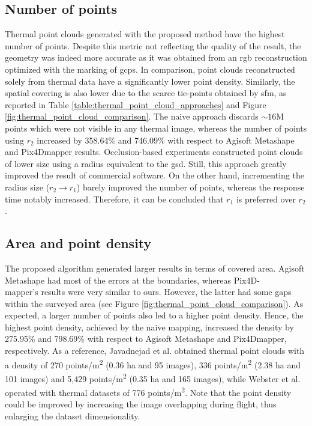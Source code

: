 \subsection{Number of points} 

Thermal point clouds generated with the proposed method have the highest number of points. Despite this metric not reflecting the quality of the result, the geometry was indeed more accurate as it was obtained from an \acrshort{rgb} reconstruction optimized with the marking of \acrshort{gcp}s. In comparison, point clouds reconstructed solely from thermal data have a significantly lower point density. Similarly, the spatial covering is also lower due to the scarce tie-points obtained by \acrshort{sfm}, as reported in Table \ref{table:thermal_point_cloud_approaches} and Figure \ref{fig:thermal_point_cloud_comparison}. The naive approach discards $\sim$16M points which were not visible in any thermal image, whereas the number of points using $r_2$ increased by 358.64\% and 746.09\% with respect to Agisoft Metashape and Pix4Dmapper results. Occlusion-based experiments constructed point clouds of lower size using a radius equivalent to the \acrshort{gsd}. Still, this approach greatly improved the result of commercial software. On the other hand, incrementing the radius size ($r_2 \rightarrow r_1$) barely improved the number of points, whereas the response time notably increased. Therefore, it can be concluded that $r_1$ is preferred over $r_2$.

\subsection{Area and point density}

The proposed algorithm generated larger results in terms of covered area. Agisoft Metashape had most of the errors at the boundaries, whereas Pix4D-\\mapper's results were very similar to ours. However, the latter had some gaps within the surveyed area (see Figure \ref{fig:thermal_point_cloud_comparison}). As expected, a larger number of points also led to a higher point density. Hence, the highest point density, achieved by the naive mapping, increased the density by 275.95\% and 798.69\% with respect to Agisoft Metashape and Pix4Dmapper, respectively. As a reference, Javadnejad et al. \cite{javadnejad_photogrammetric_2020} obtained thermal point clouds with a density of 270 points/\si{\meter\squared} (0.36 \si{\hectare} and 95 images), 336 points/\si{\meter\squared} (2.38 \si{\hectare} and 101 images) and 5,429 points/\si{\meter\squared} (0.35 \si{\hectare} and 165 images), while Webster et al. \cite{webster_three-dimensional_2018} operated with thermal datasets of 776 points/\si{\meter\squared}. Note that the point density could be improved by increasing the image overlapping during flight, thus enlarging the dataset dimensionality.

